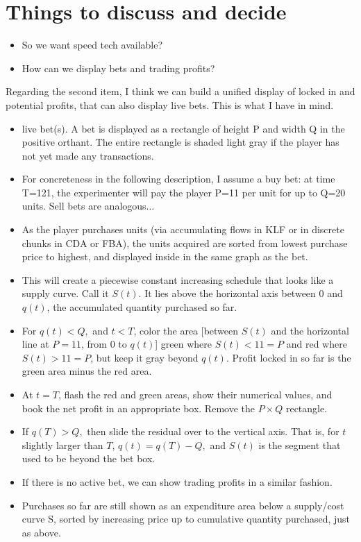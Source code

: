 \documentclass{article}
\begin{document}
\section{Things to discuss and decide}
\begin{itemize}
    \item So we want speed tech available?  
    \item How can we display bets and trading profits?
\end{itemize}
Regarding the second item, I think we can build a unified display of locked in and potential profits, that can also display live bets. This is what I have in mind.
\begin{itemize}
\item live bet(s). A bet is displayed as a rectangle of height P and width Q in the positive orthant. The entire rectangle is shaded light gray if the player has not yet made any transactions. 
\item For concreteness in the following description, I assume a buy bet: at time T=121, the experimenter will pay the player P=11 per unit for up to Q=20 units. Sell bets are analogous...
\item As the player purchases units (via accumulating flows in KLF or in discrete chunks in CDA or FBA), the units acquired are sorted from lowest purchase price to highest, and displayed inside in the same graph as the bet. \item This will create a piecewise constant increasing schedule that looks like a supply curve. Call it $S(t).$ It lies above the horizontal axis between 0 and $q(t)$, the accumulated quantity purchased so far. 
\item For $q(t)<Q,$ and $t<T$, color the area [between $S(t)$ and the horizontal line at $P=11$, from 0 to $q(t)$] green where $S(t)<11=P$ and red where $S(t)>11=P$, but keep it gray beyond $q(t).$ Profit locked in so far is the green area minus the red area.
\item At $t=T$, flash the red and green areas, show their numerical values, and book the net profit in an appropriate box. Remove the $P \times Q$ rectangle.
\item If $q(T)>Q,$ then slide the residual over to the vertical axis. That is, for $t$ slightly larger than $T$, $q(t) = q(T)-Q,$ and $S(t)$ is the segment that used to be beyond the bet box.
\item If there is no active bet, we can show trading profits in a similar fashion.
\item Purchases so far are still shown as an expenditure area below a supply/cost curve S, sorted by increasing price up to cumulative quantity purchased, just as above. 

\end{itemize}
\end{document}
